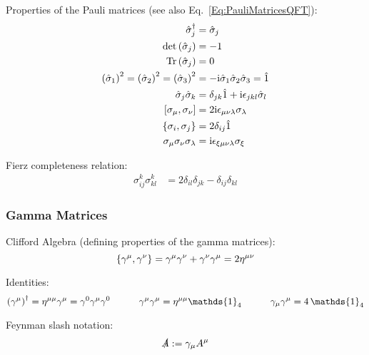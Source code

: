 			\noindent
			Properties of the Pauli matrices (see also Eq.~\ref{Eq:PauliMatricesQFT}):
			\begin{align}
				\label{Eq:PauliMatrices}
				\hat{\sigma}_j^\dagger &= \hat{\sigma}_j \\
				\det\qty(\hat{\sigma}_j) &= -1 \\
				\tr\qty(\hat{\sigma}_j) &= 0 \\
				\qty(\hat{\sigma}_1)^2 = \qty(\hat{\sigma}_2)^2 = \qty(\hat{\sigma}_3)^2 &= -\i\hat{\sigma}_1\hat{\sigma}_2\hat{\sigma}_3 = \hat{1} \\
				\hat{\sigma}_j \hat{\sigma}_k &= \delta_{jk}\hat{1} + \i\levicivita_{jkl}\hat{\sigma}_l \\
				\comm{\sigma_\mu}{\sigma_\nu} &= 2\i\levicivita_{\mu\nu\lambda}\sigma_\lambda \\
				\acomm{\sigma_i}{\sigma_j} &= 2\delta_{ij}\hat{1} \\
				\sigma_\mu \sigma_\nu \sigma_\lambda &= \i\levicivita_{\xi\mu\nu\lambda}\sigma_\xi \\
			\end{align}

			\noindent
			Fierz completeness relation:
			\begin{align}
				\sigma^k_{ij} \sigma^k_{kl} &= 2 \delta_{il} \delta_{jk} - \delta_{ij} \delta_{kl}
			\end{align}

		\subsubsection{Gamma Matrices}
			\noindent
			Clifford Algebra (defining properties of the gamma matrices):
			\begin{equation}
				\acomm{\gamma^\mu}{\gamma^\nu} = \gamma^\mu \gamma^\nu + \gamma^\nu \gamma^\mu = 2 \eta^{\mu\nu}
			\end{equation}

			\noindent
			Identities:
			\begin{equation}
				\qty(\gamma^\mu)^\dagger = \eta^{\mu\mu} \gamma^\mu = \gamma^0 \gamma^\mu \gamma^0
				\hsp \gamma^\mu \gamma^\mu = \eta^{\mu\mu} \mathds{1}_4
				\hsp \gamma_\mu \gamma^\mu = 4 \,\mathds{1}_4
			\end{equation}

			\noindent
			Feynman slash notation:
			\begin{equation}
				\slashed{A} := \gamma_\mu A^\mu
			\end{equation}


